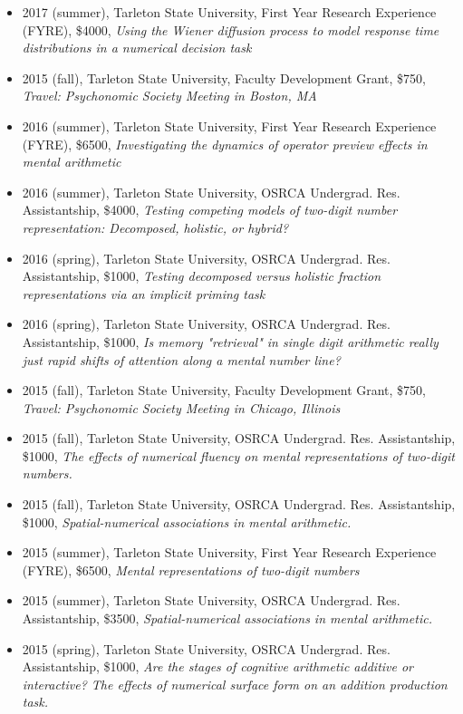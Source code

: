 \documentclass[article,10pt]{article}
\begin{document}
\begin{itemize}
\item 2017 (summer), Tarleton State University, First Year Research Experience (FYRE), \$4000, \emph{Using the Wiener diffusion process to model response time distributions in a numerical decision task}
\item 2015 (fall), Tarleton State University, Faculty Development Grant, \$750, \emph{Travel: Psychonomic Society Meeting in Boston, MA}
\item 2016 (summer), Tarleton State University, First Year Research Experience (FYRE), \$6500, \emph{Investigating the dynamics of operator preview effects in mental arithmetic}
\item 2016 (summer), Tarleton State University, OSRCA Undergrad. Res. Assistantship, \$4000, \emph{Testing competing models of two-digit number representation: Decomposed, holistic, or hybrid?}
\item 2016 (spring), Tarleton State University, OSRCA Undergrad. Res. Assistantship, \$1000, \emph{Testing decomposed versus holistic fraction representations via an implicit priming task}
\item 2016 (spring), Tarleton State University, OSRCA Undergrad. Res. Assistantship, \$1000, \emph{Is memory "retrieval" in single digit arithmetic really just rapid shifts of attention along a mental number line?}
\item 2015 (fall), Tarleton State University, Faculty Development Grant, \$750, \emph{Travel: Psychonomic Society Meeting in Chicago, Illinois}
\item 2015 (fall), Tarleton State University, OSRCA Undergrad. Res. Assistantship, \$1000, \emph{The effects of numerical fluency on mental representations of two-digit numbers.}
\item 2015 (fall), Tarleton State University, OSRCA Undergrad. Res. Assistantship, \$1000, \emph{Spatial-numerical associations in mental arithmetic.}
\item 2015 (summer), Tarleton State University, First Year Research Experience (FYRE), \$6500, \emph{Mental representations of two-digit numbers}
\item 2015 (summer), Tarleton State University, OSRCA Undergrad. Res. Assistantship, \$3500, \emph{Spatial-numerical associations in mental arithmetic.}
\item 2015 (spring), Tarleton State University, OSRCA Undergrad. Res. Assistantship, \$1000, \emph{Are the stages of cognitive arithmetic additive or interactive? The effects of numerical surface form on an addition production task.}

\end{itemize}
\end{document}
